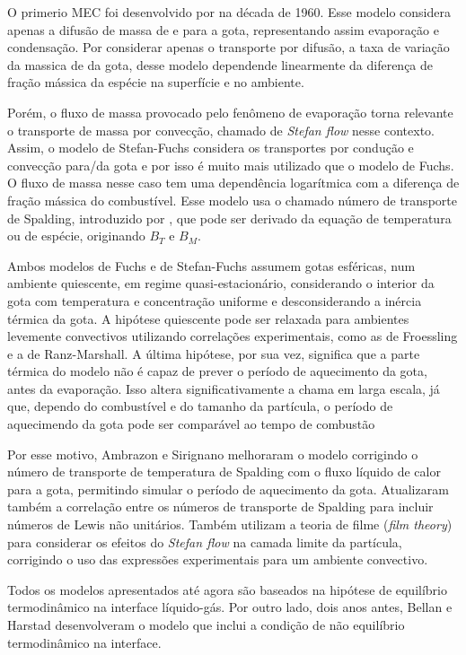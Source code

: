 
O primerio MEC foi desenvolvido por  na década de 1960. 
Esse modelo considera apenas a difusão de massa de e para a gota, representando assim evaporação e condensação.
Por considerar apenas o transporte por difusão, a taxa de variação da  massica de da gota, desse modelo dependende linearmente da diferença de fração mássica da espécie na superfície e no ambiente.

Porém, o fluxo de massa provocado pelo fenômeno de evaporação torna relevante o transporte de massa por convecção, chamado de \emph{Stefan flow} nesse contexto. 
Assim, o modelo de Stefan-Fuchs considera os transportes por condução e convecção para/da gota e por isso é muito mais utilizado que o modelo de Fuchs.
O fluxo de massa nesse caso tem uma dependência logarítmica com a diferença de fração mássica do combustível. \cite{Glassman2008, Turns2000}
Esse modelo usa o chamado número de transporte de Spalding, introduzido por , que pode ser derivado da equação de temperatura ou de espécie, originando $B_T$ e $B_M$.

Ambos modelos de Fuchs e de Stefan-Fuchs assumem gotas esféricas, num ambiente quiescente, em regime quasi-estacionário, considerando o interior da gota com temperatura e concentração uniforme e desconsiderando a inércia térmica da gota.
A hipótese quiescente pode ser relaxada para ambientes levemente convectivos utilizando correlações experimentais, como as de Froessling e a de Ranz-Marshall. 
A última hipótese, por sua vez, significa que a parte térmica do modelo não é capaz de prever o período de aquecimento da gota, antes da evaporação.
Isso altera significativamente a chama em larga escala, já que, dependo do combustível e do tamanho da partícula, o período de aquecimendo da gota pode ser comparável ao tempo de combustão  

Por esse motivo, Ambrazon e Sirignano \cite{Sirignano1989} melhoraram o modelo corrigindo o número de transporte de temperatura de Spalding com o fluxo líquido de calor para a gota, permitindo simular o período de aquecimento da gota.
Atualizaram também a correlação entre os números de transporte de Spalding para incluir números de Lewis não unitários.
Também utilizam a teoria de filme (\emph{film theory}) para considerar os efeitos do \emph{Stefan flow} na camada limite da partícula, corrigindo o uso das expressões experimentais para um ambiente convectivo. 

Todos os modelos apresentados até agora são baseados na hipótese de equilíbrio termodinâmico na interface líquido-gás.
Por outro lado, dois anos antes, Bellan e Harstad \cite{BellanJ1987} desenvolveram o modelo que inclui a condição de não equilíbrio termodinâmico na interface.

